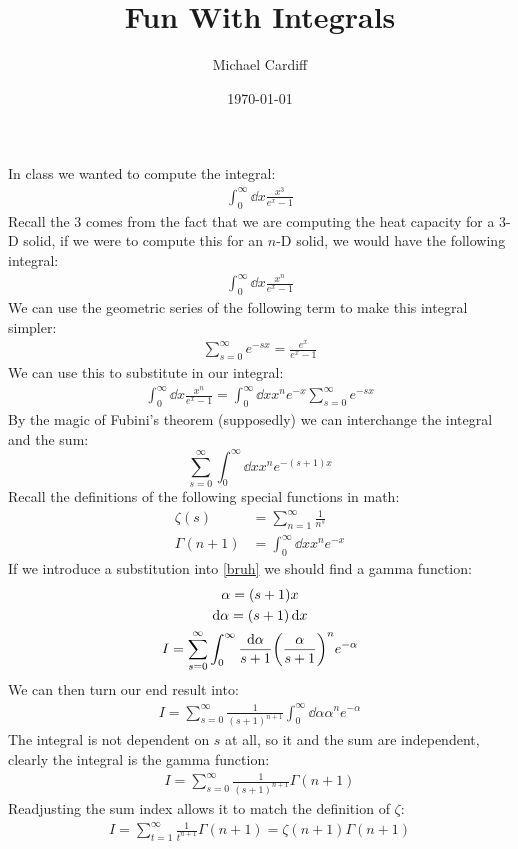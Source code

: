 \documentclass[12pt]{article}
\title{\vspace{-3em}Fun With Integrals}
\author{Michael Cardiff}
\date{\today}
\begin{document}
\maketitle
In class we wanted to compute the integral:
\begin{align*}
  \int_0^\infty\dd{x}\frac{x^3}{e^x-1}
\end{align*}
Recall the $3$ comes from the fact that we are computing the heat capacity for a 3-D solid, if we were to compute this for an $n$-D solid, we would have the following integral:
\begin{align*}
  \int_0^\infty\dd{x}\frac{x^n}{e^x-1}
\end{align*}
We can use the geometric series of the following term to make this integral simpler:
\begin{align*}
  \sum_{s=0}^{\infty}e^{-sx}=\frac{e^x}{e^x-1}
\end{align*}
We can use this to substitute in our integral:
\begin{align*}
  \int_0^\infty\dd{x}\frac{x^n}{e^x-1}=
  \int_0^\infty\dd{x}x^ne^{-x}\sum_{s=0}^\infty e^{-sx}
\end{align*}
By the magic of Fubini's theorem (supposedly) we can interchange the integral and the sum:
\begin{equation}
  \sum_{s=0}^\infty\int_0^\infty\dd{x}x^ne^{-(s+1)x}\label{bruh}
\end{equation}
Recall the definitions of the following special functions in math:
\begin{align*}
  \zeta(s)&=\sum_{n=1}^\infty\frac{1}{n^s}\\
  \Gamma(n+1)&=\int_0^\infty\dd{x}x^ne^{-x}
\end{align*}
If we introduce a substitution into \eqref{bruh} we should find a gamma function:
\begin{gather*}
  \alpha = (s+1)x\\
  \dd{\alpha} = (s+1)\dd{x}\\
  I=\sum_{s=0}^\infty\int_0^\infty\frac{\dd{\alpha}}{s+1}\qty(\frac{\alpha}{s+1})^n
  e^{-\alpha}
\end{gather*}
We can then turn our end result into:
\begin{align*}
  I=\sum_{s=0}^\infty\frac{1}{(s+1)^{n+1}}
  \int_0^\infty\dd{\alpha}\alpha^ne^{-\alpha}
\end{align*}
The integral is not dependent on $s$ at all, so it and the sum are independent, clearly the integral is the gamma function:
\begin{align*}
  I=\sum_{s=0}^\infty\frac{1}{(s+1)^{n+1}}\Gamma(n+1)
\end{align*}
Readjusting the sum index allows it to match the definition of $\zeta$:
\begin{align*}
  I=\sum_{t=1}^\infty\frac{1}{t^{n+1}}\Gamma(n+1)=\zeta(n+1)\Gamma(n+1)
\end{align*}
\end{document}
